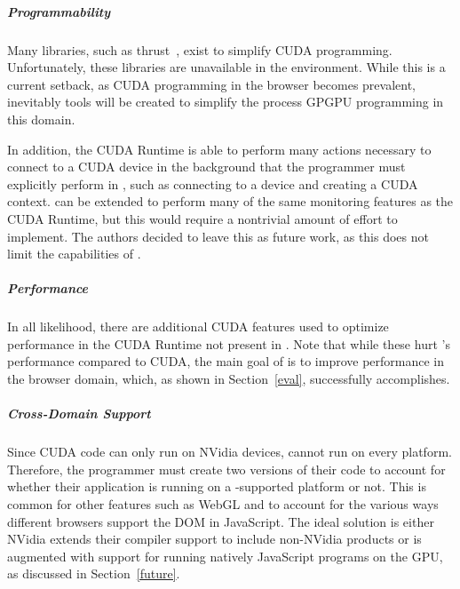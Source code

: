 
\subparagraph{Programmability} 
Many libraries, such as thrust~\cite{thrust}, exist to simplify CUDA
programming. Unfortunately, these libraries are unavailable in the \name environment. While
this is a current setback, as CUDA programming in the browser becomes prevalent,
inevitably tools will be created to simplify the process GPGPU programming in
this domain.

In addition, the CUDA Runtime is able to perform many actions necessary to
connect to a CUDA device in the background that the programmer
must explicitly perform in \namens, such as connecting to a device and creating
a CUDA context. \name can be extended to perform many of the same
monitoring features as the CUDA Runtime, but this would require a nontrivial
amount of effort to implement. The authors decided to leave this as future work,
as this does not limit the capabilities of \namens.

\subparagraph{Performance}
%
In all likelihood, there are additional CUDA features used to optimize
performance in the CUDA Runtime not present in \namens. Note that
while these hurt \namens's performance compared to CUDA, the main goal of \name
is to improve performance in the browser domain, which, as shown in
Section~\ref{eval}, \name successfully accomplishes.

\subparagraph{Cross-Domain Support} Since CUDA code can only run on NVidia
devices, \name cannot run on every platform. Therefore, the programmer must
create two versions of their code to account for whether their application is
running on a \namens-supported platform or not. This is common for other
features such as WebGL and to account for the various ways different browsers
support the DOM in JavaScript. The ideal solution is either NVidia extends their
compiler support to include non-NVidia products or \name is augmented with
support for running natively JavaScript programs on the GPU, as discussed in
Section~\ref{future}.

